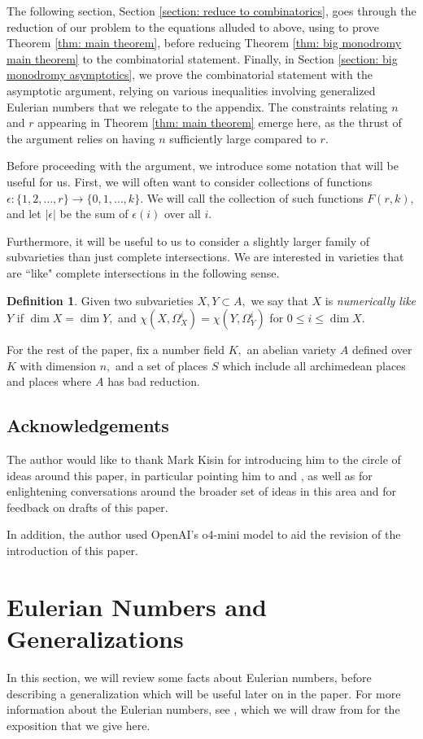 \documentclass{article}
\theoremstyle{definition}
\newtheorem{defn}[thm]{Definition}
\theoremstyle{remark}
\begin{document}
\par The following section, Section \ref{section: reduce to combinatorics}, goes through the reduction of our problem to the equations alluded to above, using \cite[Theorem D]{km24} to prove Theorem \ref{thm: main theorem}, before reducing Theorem \ref{thm: big monodromy main theorem} to the combinatorial statement. Finally, in Section \ref{section: big monodromy asymptotics}, we prove the combinatorial statement with the asymptotic argument, relying on various inequalities involving generalized Eulerian numbers that we relegate to the appendix. The constraints relating $n$ and $r$ appearing in Theorem \ref{thm: main theorem} emerge here, as the thrust of the argument relies on having $n$ sufficiently large compared to $r.$ 
\par Before proceeding with the argument, we introduce some notation that will be useful for us. First, we will often want to consider collections of functions $\epsilon: \{1, 2, \ldots, r\} \rightarrow \{0, 1, \ldots, k\}.$ We will call the collection of such functions $F(r, k),$ and let $|\epsilon|$ be the sum of $\epsilon(i)$ over all $i.$
\par Furthermore, it will be useful to us to consider a slightly larger family of subvarieties than just complete intersections. We are interested in varieties that are ``like" complete intersections in the following sense.
\begin{defn}
Given two subvarieties $X, Y \subset A,$ we say that $X$ is \textit{numerically like $Y$} if $\dim X = \dim Y,$ and $\chi(X, \Omega^i_X) = \chi(Y, \Omega^i_Y)$ for $0 \leq i \leq \dim X.$
\end{defn}
For the rest of the paper, fix a number field $K,$ an abelian variety $A$ defined over $K$ with dimension $n,$ and a set of places $S$ which include all archimedean places and places where $A$ has bad reduction.
\subsection*{Acknowledgements}
The author would like to thank Mark Kisin for introducing him to the circle of ideas around this paper, in particular pointing him to \cite{lv18} and \cite{km24}, as well as for enlightening conversations around the broader set of ideas in this area and for feedback on drafts of this paper.
\par In addition, the author used OpenAI's o4-mini model to aid the revision of the introduction of this paper.
\section{Eulerian Numbers and Generalizations}\label{section: eulerian}
In this section, we will review some facts about Eulerian numbers, before describing a generalization which will be useful later on in the paper. For more information about the Eulerian numbers, see \cite[\S 1.3 - 1.5]{eulerian}, which we will draw from for the exposition that we give here.
\end{document}
